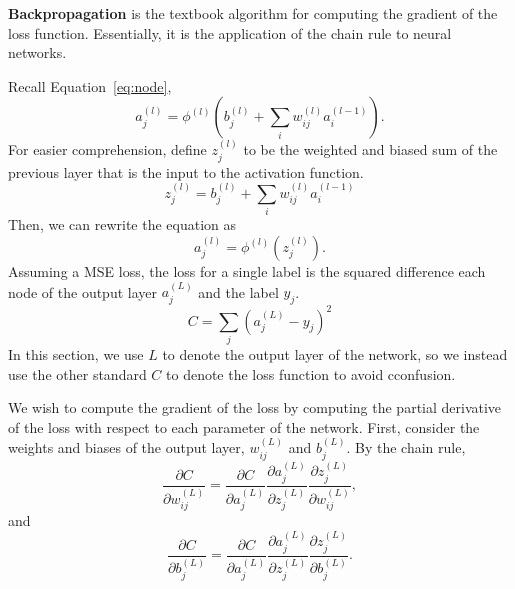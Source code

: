 \documentclass[12pt]{report}
\theoremstyle{definition}
\theoremstyle{remark}
\begin{document}
\textbf{Backpropagation} is the textbook algorithm for computing the gradient of the loss function. Essentially, it is the application of the chain rule to neural networks.

Recall Equation~\ref{eq:node},
\begin{equation}
    a^{(l)}_j = \phi^{(l)}\left(b_j^{(l)} + \sum_i w_{ij}^{(l)} a_i^{(l-1)}\right).
\end{equation}
For easier comprehension, define $z^{(l)}_j$ to be the weighted and biased sum of the previous layer that is the input to the activation function.
\begin{equation}\label{eq:weighted-sum}
    z^{(l)}_j = b_j^{(l)} + \sum_i w_{ij}^{(l)} a_i^{(l-1)}
\end{equation}
Then, we can rewrite the equation as
\begin{equation}\label{eq:simplified-node}
    a^{(l)}_j = \phi^{(l)}(z_j^{(l)}).
\end{equation}
Assuming a MSE loss, the loss for a single label is the squared difference each node of the output layer $a^{(L)}_j$ and the label $y_j$.
\begin{equation}
    C = \sum_j {(a^{(L)}_j - y_j)}^2
\end{equation}
In this section, we use $L$ to denote the output layer of the network, so we instead use the other standard $C$ to denote the loss function to avoid cconfusion.

We wish to compute the gradient of the loss by computing the partial derivative of the loss with respect to each parameter of the network. First, consider the weights and biases of the output layer, $w_{ij}^{(L)}$ and $b_j^{(L)}$. By the chain rule,
\begin{equation}\label{eq:chain-rule-weights}
    \frac{\partial C}{\partial w_{ij}^{(L)}} = \frac{\partial C}{\partial a_j^{(L)}} \frac{\partial a_j^{(L)}}{\partial z_j^{(L)}} \frac{\partial z_j^{(L)}}{\partial w_{ij}^{(L)}},
\end{equation}
and
\begin{equation}\label{eq:chain-rule-biases}
    \frac{\partial C}{\partial b_j^{(L)}} = \frac{\partial C}{\partial a_j^{(L)}} \frac{\partial a_j^{(L)}}{\partial z_j^{(L)}} \frac{\partial z_j^{(L)}}{\partial b_j^{(L)}}.
\end{equation}
\end{document}

